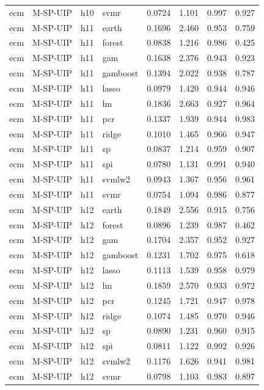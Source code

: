 \begin{ThreePartTable}
\begin{longtable}[t]{llclcccc}
ecm & M-SP-UIP & h10 & svmr & 0.0724 & 1.101 & 0.997 & 0.927\\
\addlinespace
ecm & M-SP-UIP & h11 & earth & 0.1696 & 2.460 & 0.953 & 0.759\\
ecm & M-SP-UIP & h11 & forest & 0.0838 & 1.216 & 0.986 & 0.425\\
ecm & M-SP-UIP & h11 & gam & 0.1638 & 2.376 & 0.943 & 0.923\\
ecm & M-SP-UIP & h11 & gamboost & 0.1394 & 2.022 & 0.938 & 0.787\\
ecm & M-SP-UIP & h11 & lasso & 0.0979 & 1.420 & 0.944 & 0.946\\
ecm & M-SP-UIP & h11 & lm & 0.1836 & 2.663 & 0.927 & 0.964\\
ecm & M-SP-UIP & h11 & pcr & 0.1337 & 1.939 & 0.944 & 0.983\\
ecm & M-SP-UIP & h11 & ridge & 0.1010 & 1.465 & 0.966 & 0.947\\
ecm & M-SP-UIP & h11 & sp & 0.0837 & 1.214 & 0.959 & 0.907\\
ecm & M-SP-UIP & h11 & spi & 0.0780 & 1.131 & 0.991 & 0.940\\
ecm & M-SP-UIP & h11 & svmlw2 & 0.0943 & 1.367 & 0.956 & 0.961\\
ecm & M-SP-UIP & h11 & svmr & 0.0754 & 1.094 & 0.986 & 0.877\\
\addlinespace
ecm & M-SP-UIP & h12 & earth & 0.1849 & 2.556 & 0.915 & 0.756\\
ecm & M-SP-UIP & h12 & forest & 0.0896 & 1.239 & 0.987 & 0.462\\
ecm & M-SP-UIP & h12 & gam & 0.1704 & 2.357 & 0.952 & 0.927\\
ecm & M-SP-UIP & h12 & gamboost & 0.1231 & 1.702 & 0.975 & 0.618\\
ecm & M-SP-UIP & h12 & lasso & 0.1113 & 1.539 & 0.958 & 0.979\\
ecm & M-SP-UIP & h12 & lm & 0.1859 & 2.570 & 0.933 & 0.972\\
ecm & M-SP-UIP & h12 & pcr & 0.1245 & 1.721 & 0.947 & 0.978\\
ecm & M-SP-UIP & h12 & ridge & 0.1074 & 1.485 & 0.970 & 0.946\\
ecm & M-SP-UIP & h12 & sp & 0.0890 & 1.231 & 0.960 & 0.915\\
ecm & M-SP-UIP & h12 & spi & 0.0811 & 1.122 & 0.992 & 0.926\\
ecm & M-SP-UIP & h12 & svmlw2 & 0.1176 & 1.626 & 0.941 & 0.981\\
ecm & M-SP-UIP & h12 & svmr & 0.0798 & 1.103 & 0.983 & 0.897\\

\end{longtable}
\end{ThreePartTable}
